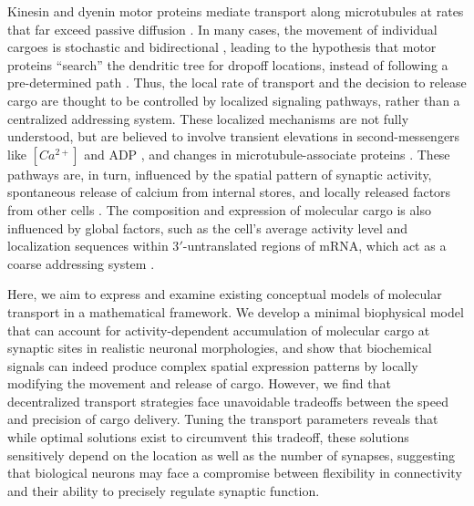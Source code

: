 \documentclass[11pt]{wlpeerj}
\begin{document}
Kinesin and dyenin motor proteins mediate transport along microtubules at rates that far exceed passive diffusion \citep{Block_1990,Smith_2001,Hirokawa_2010,Gagnon_2011,park2014visualization}.
In many cases, the movement of individual cargoes is stochastic and bidirectional \citep{Hancock_2014}, leading to the hypothesis that motor proteins ``search'' the dendritic tree for dropoff locations, instead of following a pre-determined path \citep{Welte2004,Bressloff_2009,Doyle_2011}.
Thus, the local rate of transport and the decision to release cargo are thought to be controlled by localized signaling pathways, rather than a centralized addressing system.
These localized mechanisms are not fully understood, but are believed to involve transient elevations in second-messengers like $[Ca^{2+}]$ and ADP \citep{Mironov_2007,Wang_2009,Buxbaum_2014a}, and changes in microtubule-associate proteins \citep{Soundararajan_2014}.
These pathways are, in turn, influenced by the spatial pattern of synaptic activity, spontaneous release of calcium from internal stores, and locally released factors from other cells \citep{Wong2002,Parrish2007,Park2013,Zagrebelsky2014}.
The composition and expression of molecular cargo is also influenced by global factors, such as the cell's average activity level \citep{Spitzer2006,Puthanveettil_2008,Turrigiano2011} and localization sequences within 3$'$-untranslated regions of mRNA, which act as a coarse addressing system \citep{Andreassi2009}.


Here, we aim to express and examine existing conceptual models of molecular transport \citep{Doyle_2011} in a mathematical framework.
We develop a minimal biophysical model that can account for activity-dependent accumulation of molecular cargo at synaptic sites in realistic neuronal morphologies, and show that biochemical signals can indeed produce complex spatial expression patterns by locally modifying the movement and release of cargo.
However, we find that decentralized transport strategies face unavoidable tradeoffs between the speed and precision of cargo delivery.
Tuning the transport parameters reveals that while optimal solutions exist to circumvent this tradeoff, these solutions sensitively depend on the location as well as the number of synapses, suggesting that biological neurons may face a compromise between flexibility in connectivity and their ability to precisely regulate synaptic function.
\end{document}
